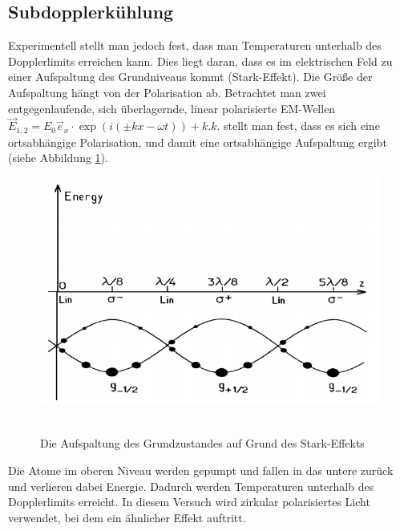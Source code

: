 \documentclass[twoside,colorback,accentcolor=tud4c,11pt]{tudreport}
\begin{document}
\subsection{Subdopplerkühlung}
Experimentell stellt man jedoch fest, dass man Temperaturen unterhalb des Dopplerlimits erreichen kann. Dies liegt daran, dass es im elektrischen Feld zu einer Aufspaltung des Grundniveaus kommt (Stark-Effekt). Die Größe der Aufspaltung hängt von der Polarisation ab. Betrachtet man zwei entgegenlaufende, sich überlagernde, linear polarisierte EM-Wellen $ \vec{E}_{1,2}=E_0\vec{e}_x\cdot \exp\left(i\left(\pm kx-\omega t\right)\right)+k.k. $ stellt man fest, dass es sich eine ortsabhängige Polarisation, und damit eine ortsabhängige Aufspaltung ergibt (siehe Abbildung \ref{fig:subdoppler}).
\begin{figure}[H]
\centering
   	\begin{minipage}[b]{.5\textwidth}
   	\includegraphics[width=\textwidth]{graphics/subdoppler.png}\
   	\end{minipage}
\caption{Die Aufspaltung des Grundzustandes auf Grund des Stark-Effekts \cite{subdoppler}}\label{fig:subdoppler}	
\end{figure}
Die Atome im oberen Niveau werden gepumpt und fallen in das untere zurück und verlieren dabei Energie. Dadurch werden Temperaturen unterhalb des Dopplerlimits erreicht. In diesem Versuch wird zirkular polarisiertes Licht verwendet, bei dem ein ähnlicher Effekt auftritt.
\end{document}

